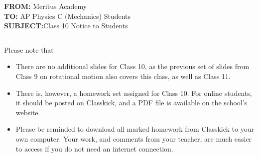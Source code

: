 \documentclass[letterpaper,11pt]{article}
\begin{document}
\textbf{FROM:}\tabto{1.3in} Meritus Academy\\
\textbf{TO:}\tabto{1.3in} AP Physics C (Mechanics) Students\\
\textbf{SUBJECT:}\tabto{1.3in}Class 10 Notice to Students

\vspace{.2in}\hrule

Please note that

\begin{itemize}[itemsep=4pt,topsep=0pt,leftmargin=15pt]
\item There are no additional slides for Class 10, as the previous set of
  slides from Class 9 on rotational motion also covers this class, as well as
  Class 11.

\item There is, however, a homework set assigned for Class 10. For online
  students, it should be posted on Classkick, and a PDF file is available on
  the school's website.

\item Please be reminded to download all marked homework from Classkick to your
  own computer. Your work, and comments from your teacher, are much easier to
  access if you do not need an internet connection.
\end{itemize}
\end{document}
